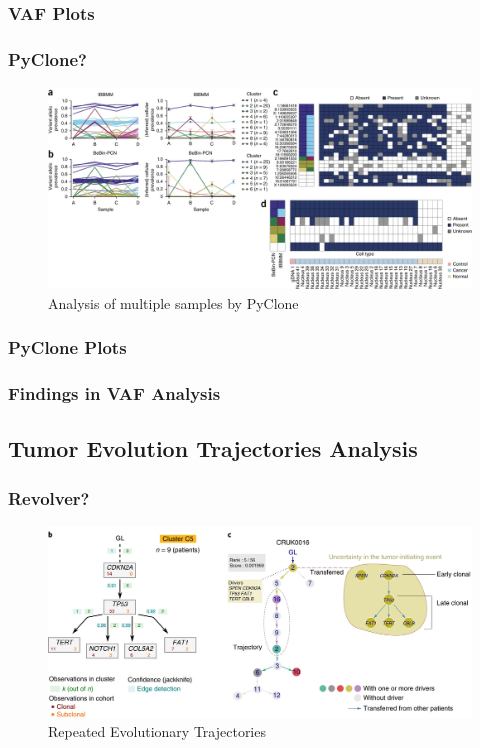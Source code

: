 \documentclass{beamer}
\begin{document}
    \begin{frame}[allowframebreaks]
        \frametitle{VAF Plots}
    \end{frame}

    \begin{frame}
        \frametitle{PyClone?}

        \begin{figure}
            \includegraphics[width=0.8 \linewidth]{figures/Workflow/PyClone.jpg}
            \caption{Analysis of multiple samples by PyClone \protect\cite{pyclone1}}
        \end{figure}
    \end{frame}

    \begin{frame}[allowframebreaks]
        \frametitle{PyClone Plots}
    \end{frame}

    \begin{frame}
        \frametitle{Findings in VAF Analysis}
    \end{frame}

    \subsection{Tumor Evolution Trajectories Analysis}
    \begin{frame}
        \frametitle{Revolver?}

        \begin{figure}
            \includegraphics[width=0.8 \linewidth]{figures/Workflow/revolver.jpg}
            \caption{Repeated Evolutionary Trajectories \protect\cite{revolver1}}
        \end{figure}
    \end{frame}
\end{document}
